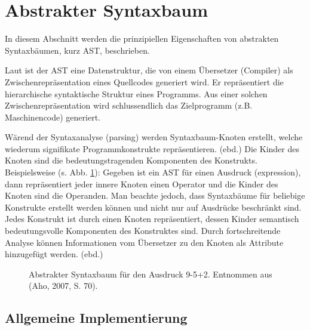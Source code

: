  
\section{Abstrakter Syntaxbaum}\label{ast-sec}
 
In diesem Abschnitt werden die prinzipiellen Eigenschaften von abstrakten Syntaxbäumen, kurz AST, beschrieben.

 
Laut \citep{Aho} ist der AST eine Datenstruktur, die von einem Übersetzer (Compiler) als Zwischenrepräsentation eines Quellcodes generiert wird. Er repräsentiert die hierarchische syntaktische Struktur eines Programms. Aus einer solchen Zwischenrepräsentation wird schlussendlich das Zielprogramm (z.B. Maschinencode) generiert.

 
Wärend der Syntaxanalyse (parsing) werden Syntaxbaum-Knoten erstellt, welche wiederum signifikate Programmkonstrukte repräsentieren. (ebd.) Die Kinder des Knoten sind die bedeutungstragenden Komponenten des Konstrukts. Beispielsweise (s. Abb. \ref{ast}): Gegeben ist ein AST für einen Ausdruck (expression), dann repräsentiert jeder innere Knoten einen Operator und die Kinder des Knoten sind die Operanden. Man beachte jedoch, dass Syntaxbäume für beliebige Konstrukte erstellt werden können und nicht nur auf Ausdrücke beschränkt sind. Jedes Konstrukt ist durch einen Knoten repräsentiert, dessen Kinder semantisch bedeutungsvolle Komponenten des Konstruktes sind. Durch fortschreitende Analyse können Informationen vom Übersetzer zu den Knoten als Attribute hinzugefügt werden. (ebd.)

 
\begin{figure}[h!]
\centering
\advance\leftskip-2.5cm
\caption[Abstrakter Syntaxbaum Beispiel]{ Abstrakter Syntaxbaum für den Ausdruck 9-5+2. Entnommen aus (Aho, 2007, S. 70). }\label{ast}
\end{figure}
 
\subsection{Allgemeine Implementierung}\label{}
 
